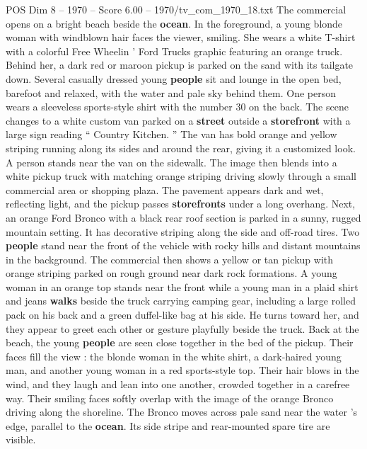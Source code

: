 \begin{textsample}{POS Dim 8 – 1970 – Score 6.00 – 1970/tv\_com\_1970\_18.txt}  \label{ex:f8_pos_035}
The commercial opens on a bright beach beside the \textbf{ocean}.
In the foreground, a young blonde woman with windblown hair faces the viewer, smiling.
She wears a white T-shirt with a colorful Free Wheelin ’ Ford Trucks graphic featuring an orange truck.
Behind her, a dark red or maroon pickup is parked on the sand with its tailgate down.
Several casually dressed young \textbf{people} sit and lounge in the open bed, barefoot and relaxed, with the water and pale sky behind them.
One person wears a sleeveless sports-style shirt with the number 30 on the back.
The scene changes to a white custom van parked on a \textbf{street} outside a \textbf{storefront} with a large sign reading “ Country Kitchen. ” The van has bold orange and yellow striping running along its sides and around the rear, giving it a customized look.
A person stands near the van on the sidewalk.
The image then blends into a white pickup truck with matching orange striping driving slowly through a small commercial area or shopping plaza.
The pavement appears dark and wet, reflecting light, and the pickup passes \textbf{storefronts} under a long overhang.
Next, an orange Ford Bronco with a black rear roof section is parked in a sunny, rugged mountain setting.
It has decorative striping along the side and off-road tires.
Two \textbf{people} stand near the front of the vehicle with rocky hills and distant mountains in the background.
The commercial then shows a yellow or tan pickup with orange striping parked on rough ground near dark rock formations.
A young woman in an orange top stands near the front while a young man in a plaid shirt and jeans \textbf{walks} beside the truck carrying camping gear, including a large rolled pack on his back and a green duffel-like bag at his side.
He turns toward her, and they appear to greet each other or gesture playfully beside the truck.
Back at the beach, the young \textbf{people} are seen close together in the bed of the pickup.
Their faces fill the view : the blonde woman in the white shirt, a dark-haired young man, and another young woman in a red sports-style top.
Their hair blows in the wind, and they laugh and lean into one another, crowded together in a carefree way.
Their smiling faces softly overlap with the image of the orange Bronco driving along the shoreline.
The Bronco moves across pale sand near the water ’s edge, parallel to the \textbf{ocean}.
Its side stripe and rear-mounted spare tire are visible.

\end{textsample}
